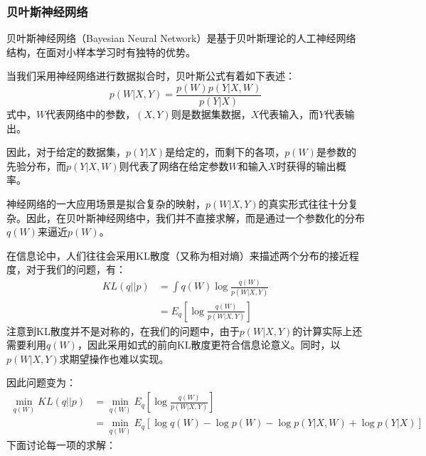 \documentclass[aps,pre,12pt,preprint,onecolumn,showpacs,showkeys]{revtex4-1}
\begin{document}
\subsubsection{贝叶斯神经网络}
贝叶斯神经网络（Bayesian Neural Network）是基于贝叶斯理论的人工神经网络结构，在面对小样本学习时有独特的优势\cite{1709.05870}。\par
当我们采用神经网络进行数据拟合时，贝叶斯公式有着如下表述：
\begin{equation}
    p(W | X, Y)=\frac{p(W) p(Y | X, W)}{p(Y | X)}
\end{equation}
式中，$W$代表网络中的参数，$(X,Y)$则是数据集数据，$X$代表输入，而$Y$代表输出。\par
因此，对于给定的数据集，$p(Y|X)$是给定的，而剩下的各项，$p(W)$是参数的先验分布，而$p(Y|X,W)$则代表了网络在给定参数$W$和输入$X$时获得的输出概率。\par
神经网络的一大应用场景是拟合复杂的映射，$p(W|X,Y)$的真实形式往往十分复杂。因此，在贝叶斯神经网络中，我们并不直接求解，而是通过一个参数化的分布
$q(W)$来逼近$p(W)$。\par
在信息论中，人们往往会采用KL散度（又称为相对熵）来描述两个分布的接近程度，对于我们的问题，有：
\begin{equation}
    \begin{aligned}
    KL(q||p)&=\int q(W)\log{\frac{q(W)}{p(W|X,Y)}}\\
    &=E_q[\log{\frac{q(W)}{p(W|X,Y)}}]
    \end{aligned}
\end{equation}
注意到KL散度并不是对称的，在我们的问题中，由于$p(W|X,Y)$的计算实际上还需要利用$q(W)$，因此采用如式的前向KL散度更符合信息论意义。同时，以$p(W|X,Y)$求期望操作也难以实现。\par
因此问题变为：
\begin{equation}
    \begin{aligned}
        \min_{q(W)}KL(q||p)&=\min_{q(W)}E_q[\log{\frac{q(W)}{p(W|X,Y)}}]\\
        &=\min_{q(W)}E_{q}[\log q(W)-\log p(W)-\log p(Y | X, W)+\log p(Y | X)]
        \end{aligned}
\end{equation}
下面讨论每一项的求解：
\end{document}
